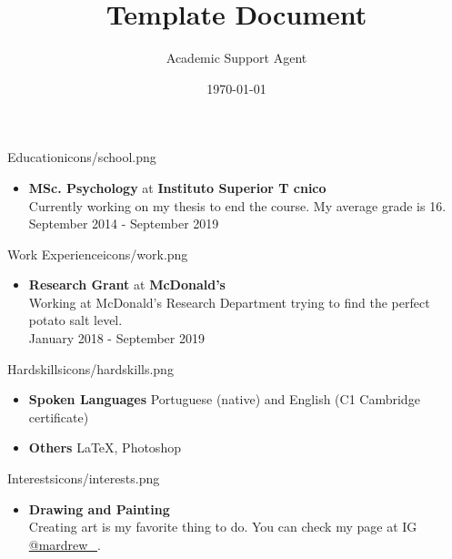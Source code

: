 \documentclass{article}
\title{Template Document}
\author{Academic Support Agent}
\date{\today}
\begin{document}
\maketitle

\begin{purplesectionleft}{Education}{icons/school.png}
{
\begin{itemize}[leftmargin=0cm,align=left]
    \item[] \textbf{MSc. Psychology} at \textbf{Instituto Superior T cnico}\\
    Currently working on my thesis to end the course. My average grade is 16. \\
    September 2014 - September 2019
\end{itemize}
}
\end{purplesectionleft}

\begin{purplesectionright}{Work Experience}{icons/work.png}
{
\begin{itemize}[leftmargin=0cm,align=left]
    \item[] \textbf{Research Grant} at \textbf{McDonald's}\\
    Working at McDonald's Research Department trying to find the perfect potato salt level.\\
    January 2018 - September 2019
\end{itemize}
}
\end{purplesectionright}

\begin{purplesectionleft}{Hardskills}{icons/hardskills.png}
{
\begin{itemize}[leftmargin=0cm,align=left]
    \item[] \textbf{Spoken Languages}
    Portuguese (native) and English (C1 Cambridge certificate)
    \\
    \item[] \textbf{Others}
    \LaTeX, Photoshop
\end{itemize}
}
\end{purplesectionleft}

\begin{purplesectionright}{Interests}{icons/interests.png}
{
\begin{itemize}[leftmargin=0cm,align=left]
    \item[] \textbf{Drawing and Painting}\\
    Creating art is my favorite thing to do. You can check my page at IG  \href{https://www.instagram.com/mardrew_/}{@mardrew\_}.\\
\end{itemize}
}
\end{purplesectionright}
\end{document}

